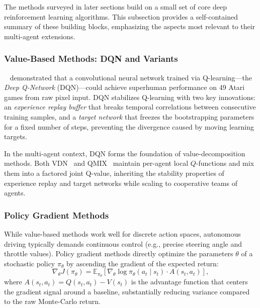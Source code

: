 \documentclass[12pt, a4paper]{article}
\begin{document}
The methods surveyed in later sections build on a small set of core deep
reinforcement learning algorithms.  This subsection provides a self-contained
summary of these building blocks, emphasizing the aspects most relevant to
their multi-agent extensions.

\subsubsection*{Value-Based Methods: DQN and Variants}

\citeauthor{mnih2015human}~\cite{mnih2015human} demonstrated that a
convolutional neural network trained via Q-learning---the \emph{Deep
Q-Network} (DQN)---could achieve superhuman performance on 49 Atari games
from raw pixel input.  DQN stabilizes Q-learning with two key innovations:
an \emph{experience replay buffer} that breaks temporal correlations between
consecutive training samples, and a \emph{target network} that freezes the
bootstrapping parameters for a fixed number of steps, preventing the
divergence caused by moving learning targets.

In the multi-agent context, DQN forms the foundation of value-decomposition
methods.  Both VDN~\cite{sunehag2018value} and QMIX~\cite{rashid2018qmix}
maintain per-agent local $Q$-functions and mix them into a factored joint
Q-value, inheriting the stability properties of experience replay and target
networks while scaling to cooperative teams of agents.

\subsubsection*{Policy Gradient Methods}

While value-based methods work well for discrete action spaces, autonomous
driving typically demands continuous control (e.g., precise steering angle
and throttle values).  Policy gradient methods directly optimize the
parameters $\theta$ of a stochastic policy $\pi_\theta$ by ascending the
gradient of the expected return:
\[
  \nabla_\theta J(\pi_\theta) = \mathbb{E}_{\pi_\theta}\!\left[
    \nabla_\theta \log \pi_\theta(a_t \mid s_t) \cdot A(s_t, a_t)\right],
\]
where $A(s_t, a_t) = Q(s_t, a_t) - V(s_t)$ is the advantage function that
centers the gradient signal around a baseline, substantially reducing
variance compared to the raw Monte-Carlo return.
\end{document}
